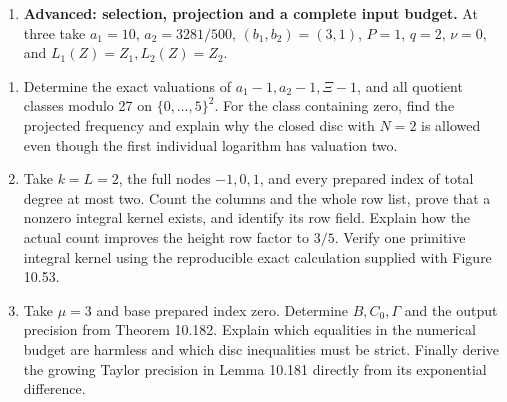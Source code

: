 \documentclass[
  11pt,
  a4paper,
]{article}
\providecommand{\tightlist}{%
  \setlength{\itemsep}{0pt}\setlength{\parskip}{0pt}}
\begin{document}
\begin{enumerate}
  unit-product homomorphism on \(\{0,\ldots,5\}^2\). Give its three
  fibres and the even-coordinate contraction of the zero fibre. Explain
  why the entire set of auxiliary polynomial indices E must be retained
  independently of that homomorphism. (b) Derive the rounding threshold
  of Lemma 10.177 and the bound on \(p^{fm}(A+m)^{-r}\). In the
  \(A_0=1/2\) row, verify both the rational gap between \(1.3701\) and
  its H endpoint and the gap between its F endpoint and \(1/1.0568\).
  Explain why endpoint calculations alone are insufficient. (c) In
  Corollary 10.179 take \(p=3,q=2,I=1,a=1,k=\ell=2,t_0=1\), with an
  empty product of the other prepared factors. Compute P exactly,
  including its coefficient valuations. Use N=2 and \(c_\lambda=1\) on
  the zero congruence fibre, with zero perturbations, to compare the
  uniform normalizing valuation with the sharper termwise one. Compute
  f(0), and explain the original field degree used in a later global
  height argument.
\item
  \textbf{Advanced: selection, projection and a complete input budget.}
  At three take \(a_1=10\), \(a_2=3281/500\), \((b_1,b_2)=(3,1)\),
  \(P=1\), \(q=2\), \(\nu=0\), and \(L_1(Z)=Z_1,L_2(Z)=Z_2\).
\end{enumerate}

\begin{enumerate}
\def\labelenumi{(\alph{enumi})}
\tightlist
\item
  Determine the exact valuations of \(a_1-1,a_2-1,\Xi-1\), and all
  quotient classes modulo 27 on \(\{0,\ldots,5\}^2\). For the class
  containing zero, find the projected frequency and explain why the
  closed disc with \(N=2\) is allowed even though the first individual
  logarithm has valuation two.
\item
  Take \(k=L=2\), the full nodes \(-1,0,1\), and every prepared index of
  total degree at most two. Count the columns and the whole row list,
  prove that a nonzero integral kernel exists, and identify its row
  field. Explain how the actual count improves the height row factor to
  \(3/5\). Verify one primitive integral kernel using the reproducible
  exact calculation supplied with Figure 10.53.
\item
  Take \(\mu=3\) and base prepared index zero. Determine
  \(B,C_0,\Gamma\) and the output precision from Theorem 10.182. Explain
  which equalities in the numerical budget are harmless and which disc
  inequalities must be strict. Finally derive the growing Taylor
  precision in Lemma 10.181 directly from its exponential difference.
\end{enumerate}
\end{document}
